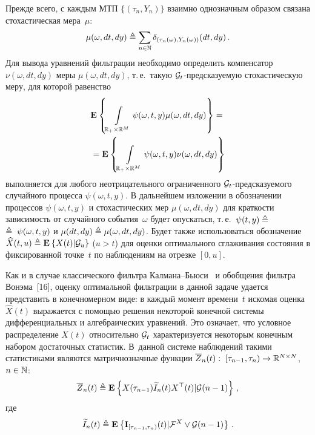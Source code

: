 \begin{multicols}{2}
 Прежде всего, с каждым МТП $\{(\tau_n,Y_n)\}$ взаимно однозначным образом связана
 стохастическая мера~$\mu$:
 \begin{equation*}
 \mu(\omega, dt, dy) \triangleq \sum\limits_{n \in \mathbb{N}}
 \delta_{(\tau_n(\omega),Y_n(\omega))}(dt,dy)\,.
 \end{equation*}
 Для вывода уравнений фильтрации необходимо определить компенсатор
 $\nu(\omega, dt, dy)$ меры $\mu(\omega, dt, dy)$, т.\,е.\
 такую ${\mathcal G}_t$-пред\-ска\-зу\-емую стохастическую меру, для которой равенство
 \begin{multline*}
  \mathbf{E}_{  }\left\{ \mathop{\displaystyle \int\limits_{\mathbb{R}_+\times \mathbb{R}^{M}}\psi(\omega,t,y)
  \mu(\omega, dt, dy)} \right\}={}\\
  {}=
  \mathbf{E}_{  }\left\{ \mathop{\displaystyle \int\limits_{\mathbb{R}_+
  \times \mathbb{R}^{M}}\psi(\omega,t,y)\nu(\omega, dt, dy)} \right\}
\end{multline*}
выполняется для любого неотрицательного ограниченного ${\mathcal G}_t$-пред\-ска\-зу\-емо\-го
случайного процесса $\psi(\omega,t,y)$.
 В дальнейшем изложении в обозначении процессов $\psi(\omega,t,y)$ и стохастических
 мер $\mu(\omega, dt, dy)$ для краткости зависимость от случайного события~$\omega$
 будет опускаться, т.\,е.\ $\psi(t,y) \triangleq$\linebreak $\triangleq\;\psi(\omega,t,y)$ и
 $\mu(dt, dy) \triangleq \mu(\omega, dt, dy)$. Будет также использоваться
 обозначение $\widehat{X}(t,u) \triangleq\mathbf{E}_{  }\left\{ \mathop{X(t)|{\mathcal G}_u} \right\}$ ($u>t$) для
 оценки оптимального сглаживания состояния в фиксированной точке~$t$
 по наблюдениям на отрезке $[0,u]$.


 Как и в случае классического фильтра Кал\-ма\-на--Бью\-си~\cite{KalmanB_60}
 и обобщения фильтра Вонэма~[16], оценку оптимальной фильтрации в данной задаче удается
 представить в конечномерном виде: в каждый момент времени~$t$ искомая оценка
 $\widehat{X}(t)$ выражается с помощью решения некоторой конечной системы
 дифференциальных и алгебраических уравнений. Это означает, что условное
 распределение $X(t)$ относительно ${\mathcal G}_t$ характеризуется некоторым конечным
 набором достаточных статистик. В~данной системе наблюдений такими статистиками
 являются матричнозначные функции
 $\overline{Z}_n(t): \; [\tau_{n-1},\tau_n) \hm\to \mathbb{R}^{N \times N}$,
 $n \hm\in \mathbb{N}$:
 \begin{equation*}
 \overline{Z}_n(t) \triangleq \mathbf{E}_{  }\left\{ \mathop{X(\tau_{n-1})\widetilde{I}_n(t)X^{\top}(t)|{\mathcal G}(n-1)} \right\}\,,
 \end{equation*}
 где
 \begin{equation*}
 \widetilde{I}_n(t) \triangleq \mathbf{E}_{  }\left\{ \mathop{\mathbf{I}_{[\tau_{n-1},\tau_{n})}(t)|{\mathcal F}^X \vee {\mathcal G}(n-1)} \right\}\,.
 \end{equation*}


\end{multicols}
